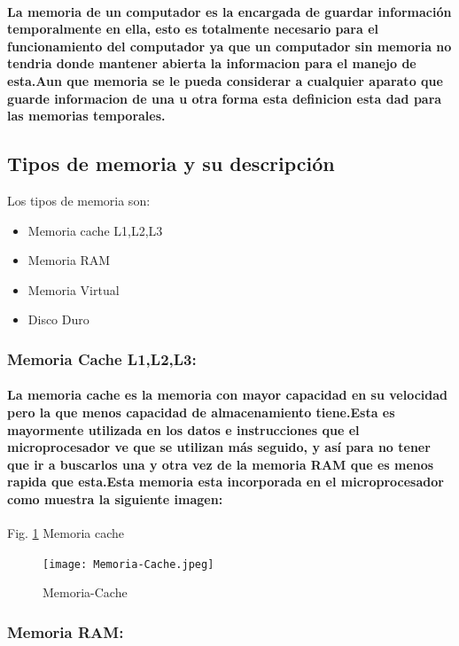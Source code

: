 \documentclass{article}
\begin{document}
\paragraph{La memoria de un computador es la encargada de guardar información temporalmente en ella, esto es totalmente necesario para el funcionamiento del computador ya que un computador sin memoria no tendria donde mantener abierta la informacion para el manejo de esta.Aun que memoria se le pueda considerar a cualquier aparato que guarde informacion de una u otra forma esta definicion esta dad para las memorias temporales.}

\subsection{Tipos de memoria y su descripción}

Los tipos de memoria son:
\begin{itemize}
    \item Memoria cache L1,L2,L3
    \item Memoria RAM
    \item Memoria Virtual
    \item Disco Duro
\end{itemize}

\subsubsection{Memoria Cache L1,L2,L3:}

\paragraph{La memoria cache es la memoria con mayor capacidad en su velocidad pero la que menos capacidad de almacenamiento tiene.Esta es mayormente utilizada en los datos e instrucciones que el microprocesador
ve que se utilizan más seguido, y así para no tener que ir a buscarlos una y otra vez de la
memoria RAM que es menos rapida que esta.Esta memoria esta incorporada en el microprocesador como muestra la siguiente imagen:\cite{taller}}

Fig. \ref{fig:Memoria-Cache} Memoria cache
    \begin{figure}[h]
    \texttt{[image: Memoria-Cache.jpeg]}
    \centering
    \caption{Memoria-Cache}
    \label{fig:Memoria-Cache}
    \end{figure}

\subsubsection{Memoria RAM:}
\end{document}
